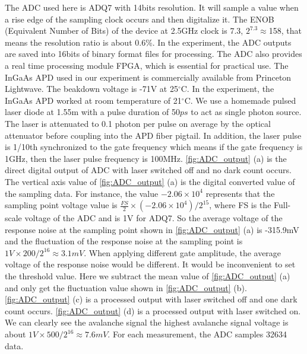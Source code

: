 \documentclass[%
 reprint,
superscriptaddress,
 amsmath,amssymb,
 aps,
]{revtex4-1}
\begin{document}

The ADC used here is ADQ7 with 14bits resolution. It will sample a value when a rise edge of the sampling clock occurs and then digitalize it. The ENOB (Equivalent Number of Bits) of the device at 2.5GHz clock is 7.3, $2^{7.3} \approx $158, that means the resolution ratio is about 0.6\%. %
In the experiment, the ADC outputs are saved into 16bits of binary format files for processing. %
The ADC also provides a real time processing module FPGA, which is essential for practical use. The InGaAs APD used in our experiment is commercially available from Princeton Lightwave. The beakdown voltage is -71V at 25$^{\circ}$C. In the experiment, the InGaAs APD worked at room temperature of 21$^{\circ}$C. We use a homemade pulsed laser diode at 1.55\textmu m with a pulse duration of 50$ps$ to act as single photon source. The laser is attenuated to 0.1 photon per pulse on average by the optical attenuator before coupling into the APD fiber pigtail. In addition, the laser pulse is 1/10th synchronized to the gate frequency which means if the gate frequency is 1GHz, then the laser pulse frequency is 100MHz. \autoref{fig:ADC_output} (a) is the direct digital output of ADC with laser switched off and no dark count occurs. The vertical axis value of \autoref{fig:ADC_output} (a) is the digital converted value of the sampling data. For instance, the value $-2.06\times10^4$ represents that the sampling point voltage value is $\frac{FS}{2} \times(-2.06\times10^4)/2^{15}$, where FS is the Full-scale voltage of the ADC and is 1V for ADQ7. So the average voltage of the response noise at the sampling point shown in \autoref{fig:ADC_output} (a) is -315.9mV and the fluctuation of the response noise at the sampling point is $1V \times 200/2^{16} \approx 3.1mV$. When applying different gate amplitude, the average voltage of the response noise would be different. It would be inconvenient to set the threshold value. Here we subtract the mean value of \autoref{fig:ADC_output} (a) and only get the fluctuation value shown in \autoref{fig:ADC_output} (b). \autoref{fig:ADC_output} (c) is a processed output with laser switched off and one dark count occurs. \autoref{fig:ADC_output} (d) is a processed output with laser switched on. We can clearly see the avalanche signal the highest avalanche signal voltage is about $1V \times 500/2^{16} \approx 7.6mV$. For each measurement, the ADC samples 32634 data. %
\end{document}
